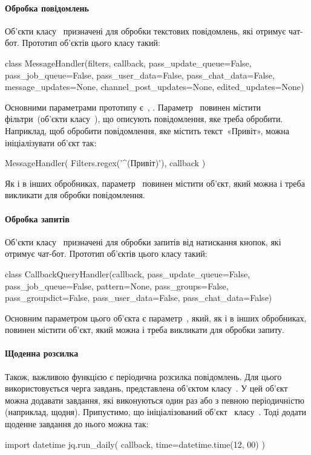 \documentclass[
	a4paper,
	oneside,
	BCOR = 10mm,
	DIV = 12,
	12pt,
	headings = normal,
]{scrartcl}
\begin{document}
				\paragraph{Обробка повідомлень}
				Об'єкти класу~ призначені для обробки текстових повідомлень, які отримує чат-бот. Прототип об'єктів цього класу такий:
				\begin{pythoncode}
class MessageHandler(filters, callback, pass_update_queue=False, pass_job_queue=False, pass_user_data=False, pass_chat_data=False, message_updates=None, channel_post_updates=None, edited_updates=None)
				\end{pythoncode}
				Основними параметрами прототипу є~, . Параметр~ повинен містити фільтри~(об'єкти класу~), що описують повідомлення, яке треба обробити. Наприклад, щоб обробити повідомлення, яке містить текст~«Привіт», можна ініціалізувати об'єкт так:
				\begin{pythoncode}
					MessageHandler(
					    Filters.regex('^(Привіт)'),
					    callback
					)
				\end{pythoncode}
				Як і в інших обробниках, параметр~ повинен містити об'єкт, який можна і треба викликати для обробки повідомлення.

				\paragraph{Обробка запитів}
				Об'єкти класу~ призначені для обробки запитів від натискання кнопок, які отримує чат-бот. Прототип об'єктів цього класу такий:
				\begin{pythoncode}
class CallbackQueryHandler(callback, pass_update_queue=False, pass_job_queue=False, pattern=None, pass_groups=False, pass_groupdict=False, pass_user_data=False, pass_chat_data=False)
				\end{pythoncode}
				Основним параметром цього об'єкта є параметр~, який, як і в інших обробниках, повинен містити об'єкт, який можна і треба викликати для обробки запиту.
				
				\paragraph{Щоденна розсилка}
				Також, важливою функцією є періодична розсилка повідомлень. Для цього використовується черга завдань, представлена об'єктом класу~. У цей об'єкт можна додавати завдання, які виконуються один раз або з певною періодичністю (наприклад, щодня). Припустимо, що ініціалізований об'єкт~ класу~. Тоді додати щоденне завдання до нього можна так:
				\begin{pythoncode}
					import datetime
					jq.run_daily(
					    callback,
					    time=datetime.time(12, 00)
					)
				\end{pythoncode}
\end{document}
